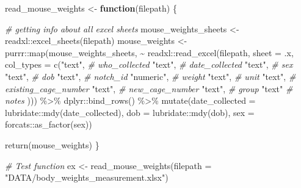 \documentclass[
]{book}
\newenvironment{Shaded}{\begin{snugshade}}{\end{snugshade}}
\newcommand{\AttributeTok}[1]{\textcolor[rgb]{0.77,0.63,0.00}{#1}}
\newcommand{\CommentTok}[1]{\textcolor[rgb]{0.56,0.35,0.01}{\textit{#1}}}
\newcommand{\ControlFlowTok}[1]{\textcolor[rgb]{0.13,0.29,0.53}{\textbf{#1}}}
\newcommand{\FunctionTok}[1]{\textcolor[rgb]{0.00,0.00,0.00}{#1}}
\newcommand{\NormalTok}[1]{#1}
\newcommand{\OtherTok}[1]{\textcolor[rgb]{0.56,0.35,0.01}{#1}}
\newcommand{\SpecialCharTok}[1]{\textcolor[rgb]{0.00,0.00,0.00}{#1}}
\newcommand{\StringTok}[1]{\textcolor[rgb]{0.31,0.60,0.02}{#1}}
\begin{document}
\begin{Shaded}
\begin{Highlighting}[]
\NormalTok{read\_mouse\_weights }\OtherTok{\textless{}{-}} \ControlFlowTok{function}\NormalTok{(filepath) \{}
  
  \CommentTok{\# getting info about all excel sheets}
\NormalTok{  mouse\_weights\_sheets }\OtherTok{\textless{}{-}}\NormalTok{ readxl}\SpecialCharTok{::}\FunctionTok{excel\_sheets}\NormalTok{(filepath)}
\NormalTok{  mouse\_weights }\OtherTok{\textless{}{-}}\NormalTok{ purrr}\SpecialCharTok{::}\FunctionTok{map}\NormalTok{(mouse\_weights\_sheets, }
                              \SpecialCharTok{\textasciitilde{}}\NormalTok{ readxl}\SpecialCharTok{::}\FunctionTok{read\_excel}\NormalTok{(filepath, }\AttributeTok{sheet =}\NormalTok{ .x, }
                                                   \AttributeTok{col\_types =} \FunctionTok{c}\NormalTok{(}\StringTok{"text"}\NormalTok{,   }\CommentTok{\# who\_collected}
                                                                 \StringTok{"text"}\NormalTok{,   }\CommentTok{\# date\_collected}
                                                                 \StringTok{"text"}\NormalTok{,   }\CommentTok{\#  sex}
                                                                 \StringTok{"text"}\NormalTok{,   }\CommentTok{\# dob}
                                                                 \StringTok{"text"}\NormalTok{,   }\CommentTok{\# notch\_id}
                                                                 \StringTok{"numeric"}\NormalTok{, }\CommentTok{\# weight}
                                                                 \StringTok{"text"}\NormalTok{,   }\CommentTok{\# unit}
                                                                 \StringTok{"text"}\NormalTok{,   }\CommentTok{\# existing\_cage\_number}
                                                                 \StringTok{"text"}\NormalTok{,   }\CommentTok{\# new\_cage\_number}
                                                                 \StringTok{"text"}\NormalTok{,   }\CommentTok{\# group}
                                                                 \StringTok{"text"}    \CommentTok{\# notes}
\NormalTok{                                                                 ))) }\SpecialCharTok{\%\textgreater{}\%} 
\NormalTok{    dplyr}\SpecialCharTok{::}\FunctionTok{bind\_rows}\NormalTok{() }\SpecialCharTok{\%\textgreater{}\%} 
    \FunctionTok{mutate}\NormalTok{(}\AttributeTok{date\_collected =}\NormalTok{ lubridate}\SpecialCharTok{::}\FunctionTok{mdy}\NormalTok{(date\_collected), }
           \AttributeTok{dob =}\NormalTok{ lubridate}\SpecialCharTok{::}\FunctionTok{mdy}\NormalTok{(dob), }
           \AttributeTok{sex =}\NormalTok{ forcats}\SpecialCharTok{::}\FunctionTok{as\_factor}\NormalTok{(sex))}

  \FunctionTok{return}\NormalTok{(mouse\_weights)}
\NormalTok{\}}

\CommentTok{\# Test function}
\NormalTok{ex }\OtherTok{\textless{}{-}} \FunctionTok{read\_mouse\_weights}\NormalTok{(}\AttributeTok{filepath =} \StringTok{"DATA/body\_weights\_measurement.xlsx"}\NormalTok{)}
\end{Highlighting}
\end{Shaded}
\end{document}
